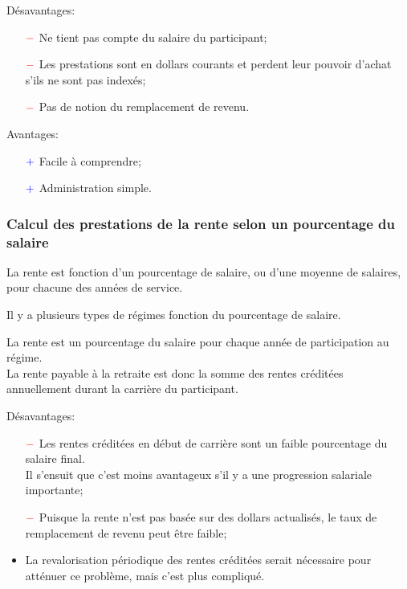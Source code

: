 \documentclass[10pt, french]{article}
\begin{document}
\begin{multicols*}{3}
\begin{definitionNOHFILL}
Désavantages:
\begin{itemize}
	\item[$\color{red}-$]	Ne tient pas compte du salaire du participant;
	\item[$\color{red}-$]	Les prestations sont en dollars courants et perdent leur pouvoir d'achat s'ils ne sont pas indexés;
	\item[$\color{red}-$]	Pas de notion du remplacement de revenu.
\end{itemize}

Avantages:
\begin{itemize}
	\item[$\color{blue}+$]	Facile à comprendre;
	\item[$\color{blue}+$]	Administration simple.
\end{itemize}
\end{definitionNOHFILL}

\subsubsection*{Calcul des prestations de la rente selon un pourcentage du salaire}

La rente est fonction d'un pourcentage de salaire, ou d'une moyenne de salaires, pour chacune des années de service.

Il y a plusieurs types de régimes fonction du pourcentage de salaire.

\begin{definitionNOHFILL}
La rente est un pourcentage du salaire pour chaque année de participation au régime. \\
La rente payable à la retraite est donc la somme des rentes créditées annuellement durant la carrière du participant.

Désavantages:
\begin{itemize}
	\item[$\color{red}-$]	Les rentes créditées en début de carrière sont un faible pourcentage du salaire final.\\
							Il s'ensuit que c'est moins avantageux s'il y a une progression salariale importante;
	\item[$\color{red}-$]	Puisque la rente n'est pas basée sur des dollars actualisés, le taux de remplacement de revenu peut être faible;
	\item	La revalorisation périodique des rentes créditées serait nécessaire pour atténuer ce problème, mais c'est plus compliqué.
\end{itemize}


\end{definitionNOHFILL}
\end{multicols*}
\end{document}
